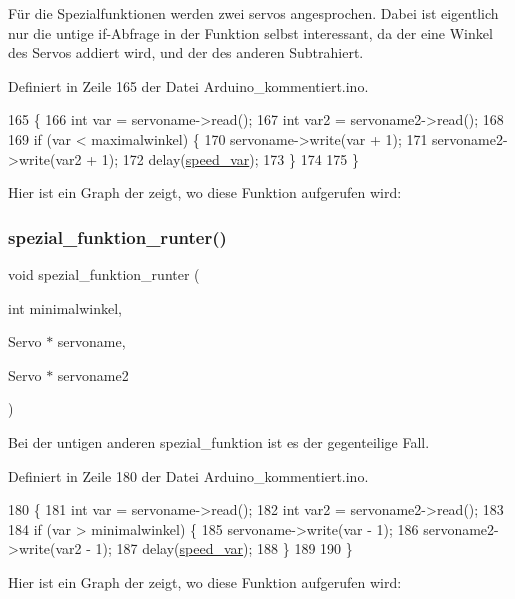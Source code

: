 Für die Spezialfunktionen werden zwei servos angesprochen. Dabei ist eigentlich nur die untige if-\/\+Abfrage in der Funktion selbst interessant, da der eine Winkel des Servos addiert wird, und der des anderen Subtrahiert. 



Definiert in Zeile 165 der Datei Arduino\+\_\+kommentiert.\+ino.


\begin{DoxyCode}
165                                                                                     \{
166   \textcolor{keywordtype}{int} var = servoname->read();
167   \textcolor{keywordtype}{int} var2 = servoname2->read();
168 
169   \textcolor{keywordflow}{if} (var < maximalwinkel) \{
170     servoname->write(var + 1);
171     servoname2->write(var2 + 1);
172     delay(\hyperlink{_arduino__kommentiert_8ino_a8b03f5396d8e845086daab48dcaca5cb}{speed\_var});
173   \}
174 
175 \}
\end{DoxyCode}
Hier ist ein Graph der zeigt, wo diese Funktion aufgerufen wird\+:
\mbox{\label{_arduino__kommentiert_8ino_abf7a5d6cd0eca7c0dacb61f5ef555beb}} 
\subsubsection{\texorpdfstring{spezial\+\_\+funktion\+\_\+runter()}{spezial\_funktion\_runter()}}
{\footnotesize\ttfamily void spezial\+\_\+funktion\+\_\+runter (\begin{DoxyParamCaption}\item[{int}]{minimalwinkel,  }\item[{Servo $\ast$}]{servoname,  }\item[{Servo $\ast$}]{servoname2 }\end{DoxyParamCaption})}



Bei der untigen anderen spezial\+\_\+funktion ist es der gegenteilige Fall. 



Definiert in Zeile 180 der Datei Arduino\+\_\+kommentiert.\+ino.


\begin{DoxyCode}
180                                                                                       \{
181   \textcolor{keywordtype}{int} var = servoname->read();
182   \textcolor{keywordtype}{int} var2 = servoname2->read();
183 
184   \textcolor{keywordflow}{if} (var > minimalwinkel) \{
185     servoname->write(var - 1);
186     servoname2->write(var2 - 1);
187     delay(\hyperlink{_arduino__kommentiert_8ino_a8b03f5396d8e845086daab48dcaca5cb}{speed\_var});
188   \}
189 
190 \}
\end{DoxyCode}
Hier ist ein Graph der zeigt, wo diese Funktion aufgerufen wird\+:


